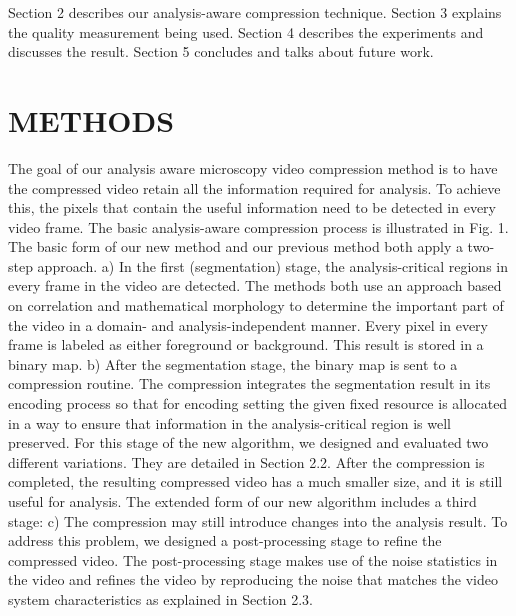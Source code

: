 Section 2 describes our analysis-aware compression technique. Section 3 explains the quality measurement being used. Section 4 describes the experiments and discusses the result.  Section 5 concludes and talks about future work.

\section{METHODS}
The goal of our analysis aware microscopy video compression method is to have the compressed video retain all the information required for analysis. To achieve this, the pixels that contain the useful information need to be detected in every video frame.
The basic analysis-aware compression process is illustrated in Fig. 1. The basic form of our new method and our previous method both apply a two-step approach. a) In the first (segmentation) stage, the analysis-critical regions in every frame in the video are detected. The methods both use an approach based on correlation and mathematical morphology to determine the important part of the video in a domain- and analysis-independent manner. Every pixel in every frame is labeled as either foreground or background. This result is stored in a binary map. b) After the segmentation stage, the binary map is sent to a compression routine. The compression integrates the segmentation result in its encoding process so that for encoding setting the given fixed resource is allocated in a way to ensure that information in the analysis-critical region is well preserved. For this stage of the new algorithm, we designed and evaluated two different variations. They are detailed in Section 2.2.  After the compression is completed, the resulting compressed video has a much smaller size, and it is still useful for analysis. The extended form of our new algorithm includes a third stage: c) The compression may still introduce changes into the analysis result. To address this problem, we designed a post-processing stage to refine the compressed video. The post-processing stage makes use of the noise statistics in the video and refines the video by reproducing the noise that matches the video system characteristics as explained in Section 2.3.

